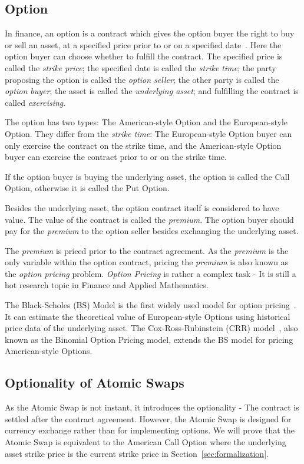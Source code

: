 \subsection{Option}
\label{subsec:background_option}

In finance, an option is a contract which gives the option buyer the right to buy or sell an asset, at a specified price prior to or on a specified date~\cite{higham2004introduction}.
Here the option buyer can choose whether to fulfill the contract.
The specified price is called the \textit{strike price};
the specified date is called the \textit{strike time};
the party proposing the option is called the \textit{option seller};
the other party is called the \textit{option buyer};
the asset is called the \textit{underlying asset};
and fulfilling the contract is called \textit{exercising}.

The option has two types: The American-style Option and the European-style Option.
They differ from the \textit{strike time}:
The European-style Option buyer can only exercise the contract on the strike time,
and the American-style Option buyer can exercise the contract prior to or on the strike time.

If the option buyer is buying the underlying asset, the option is called the Call Option, otherwise it is called the Put Option.

Besides the underlying asset, the option contract itself is considered to have value.
The value of the contract is called the \textit{premium}.
The option buyer should pay for the \textit{premium} to the option seller besides exchanging the underlying asset.

The \textit{premium} is priced prior to the contract agreement.
As the \textit{premium} is the only variable within the option contract,
pricing the \textit{premium} is also known as the \textit{option pricing} problem.
\textit{Option Pricing} is rather a complex task - It is still a hot research topic in Finance and Applied Mathematics.

The Black-Scholes (BS) Model is the first widely used model for option pricing~\cite{black1973pricing}.
It can estimate the theoretical value of European-style Options using historical price data of the underlying asset.
The Cox-Ross-Rubinstein (CRR) model~\cite{cox1979option}, also known as the Binomial Option Pricing model, extends the BS model for pricing American-style Options.

\subsection{Optionality of Atomic Swaps}

As the Atomic Swap is not instant, it introduces the optionality - The contract is settled after the contract agreement.
However, the Atomic Swap is designed for currency exchange rather than for implementing options.
We will prove that the Atomic Swap is equivalent to the American Call Option
where the underlying asset strike price is the current strike price in Section~\ref{sec:formalization}.